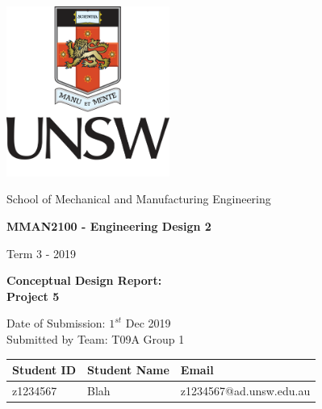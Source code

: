 \documentclass[12pt]{report}
\begin{document}
    \begin{titlepage}
        \begin{center}
            \includegraphics[width=0.4\textwidth]{unswLogo}
            
            \begin{huge}
            \end{huge}
            
            \vspace*{0.6cm}
            
            School of Mechanical and Manufacturing Engineering
            \vspace{0.6cm}
            
            \textbf{MMAN2100 - Engineering Design 2}
            \vspace{0.3cm}
            
            Term 3 - 2019
            \vspace{0.3cm}
     
            \textbf{Conceptual Design Report:\\Project 5}
            \vspace{0.3cm}
            
            
            Date of Submission: $1^{st}$ Dec 2019\\
            Submitted by Team: T09A Group 1

            \begin{table}[h]
                \centering
                \begin{tabular}[h]{|l|l|l|}\hline
                    Student ID & Student Name & Email \\\hline
                    z1234567 & Blah & z1234567@ad.unsw.edu.au \\\hline
                \end{tabular}
            \end{table}

       \end{center}
    \end{titlepage}
\end{document}
